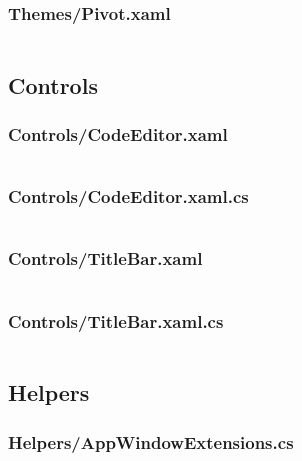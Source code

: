 \documentclass[a4paper]{report}
\begin{document}
\inputminted{xml}{"../src/Algorithm Dynamics/Themes/GridSplitter.xaml"}

\subsubsection{Themes/Pivot.xaml}

\inputminted{xml}{"../src/Algorithm Dynamics/Themes/Pivot.xaml"}

\subsection{Controls}

\subsubsection{Controls/CodeEditor.xaml}

\inputminted{xml}{"../src/Algorithm Dynamics/Controls/CodeEditor.xaml"}

\subsubsection{Controls/CodeEditor.xaml.cs}

\inputminted{csharp}{"../src/Algorithm Dynamics/Controls/CodeEditor.xaml.cs"}

\subsubsection{Controls/TitleBar.xaml}

\inputminted{xml}{"../src/Algorithm Dynamics/Controls/TitleBar.xaml"}

\subsubsection{Controls/TitleBar.xaml.cs}

\inputminted{csharp}{"../src/Algorithm Dynamics/Controls/TitleBar.xaml.cs"}

\subsection{Helpers}

\subsubsection{Helpers/AppWindowExtensions.cs}

\inputminted{csharp}{"../src/Algorithm Dynamics/Helpers/AppWindowExtensions.cs"}
\end{document}
